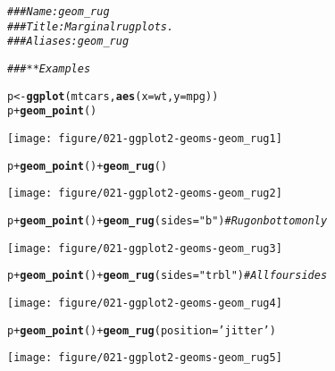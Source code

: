 \documentclass[a4paper,titlepage]{tufte-handout}\usepackage[]{graphicx}\usepackage[]{color}
\makeatletter
\def\maxwidth{ %
  \ifdim\Gin@nat@width>\linewidth
    \linewidth
  \else
    \Gin@nat@width
  \fi
}
\newcommand{\hlstr}[1]{\textcolor[rgb]{0.192,0.494,0.8}{#1}}%
\newcommand{\hlcom}[1]{\textcolor[rgb]{0.678,0.584,0.686}{\textit{#1}}}%
\newcommand{\hlopt}[1]{\textcolor[rgb]{0,0,0}{#1}}%
\newcommand{\hlstd}[1]{\textcolor[rgb]{0.345,0.345,0.345}{#1}}%
\newcommand{\hlkwb}[1]{\textcolor[rgb]{0.69,0.353,0.396}{#1}}%
\newcommand{\hlkwc}[1]{\textcolor[rgb]{0.333,0.667,0.333}{#1}}%
\newcommand{\hlkwd}[1]{\textcolor[rgb]{0.737,0.353,0.396}{\textbf{#1}}}%
\newenvironment{kframe}{%
 \def\at@end@of@kframe{}%
 \ifinner\ifhmode%
  \def\at@end@of@kframe{\end{minipage}}%
  \begin{minipage}{\columnwidth}%
 \fi\fi%
 \def\FrameCommand##1{\hskip\@totalleftmargin \hskip-\fboxsep
 \colorbox{shadecolor}{##1}\hskip-\fboxsep
     \hskip-\linewidth \hskip-\@totalleftmargin \hskip\columnwidth}%
 \MakeFramed {\advance\hsize-\width
   \@totalleftmargin\z@ \linewidth\hsize
   \@setminipage}}%
 {\par\unskip\endMakeFramed%
 \at@end@of@kframe}
\newenvironment{knitrout}{}{} %
\makeatother
\begin{document}
\begin{knitrout}
\color{fgcolor}\begin{kframe}
\begin{alltt}
\hlcom{### Name: geom_rug}
\hlcom{### Title: Marginal rug plots.}
\hlcom{### Aliases: geom_rug}

\hlcom{### ** Examples}

\hlstd{p} \hlkwb{<-} \hlkwd{ggplot}\hlstd{(mtcars,} \hlkwd{aes}\hlstd{(}\hlkwc{x}\hlstd{=wt,} \hlkwc{y}\hlstd{=mpg))}
\hlstd{p} \hlopt{+} \hlkwd{geom_point}\hlstd{()}
\end{alltt}
\end{kframe}
\texttt{[image: figure/021-ggplot2-geoms-geom\_rug1]} 
\begin{kframe}\begin{alltt}
\hlstd{p} \hlopt{+} \hlkwd{geom_point}\hlstd{()} \hlopt{+} \hlkwd{geom_rug}\hlstd{()}
\end{alltt}
\end{kframe}
\texttt{[image: figure/021-ggplot2-geoms-geom\_rug2]} 
\begin{kframe}\begin{alltt}
\hlstd{p} \hlopt{+} \hlkwd{geom_point}\hlstd{()} \hlopt{+} \hlkwd{geom_rug}\hlstd{(}\hlkwc{sides}\hlstd{=}\hlstr{"b"}\hlstd{)}    \hlcom{# Rug on bottom only}
\end{alltt}
\end{kframe}
\texttt{[image: figure/021-ggplot2-geoms-geom\_rug3]} 
\begin{kframe}\begin{alltt}
\hlstd{p} \hlopt{+} \hlkwd{geom_point}\hlstd{()} \hlopt{+} \hlkwd{geom_rug}\hlstd{(}\hlkwc{sides}\hlstd{=}\hlstr{"trbl"}\hlstd{)} \hlcom{# All four sides}
\end{alltt}
\end{kframe}
\texttt{[image: figure/021-ggplot2-geoms-geom\_rug4]} 
\begin{kframe}\begin{alltt}
\hlstd{p} \hlopt{+} \hlkwd{geom_point}\hlstd{()} \hlopt{+} \hlkwd{geom_rug}\hlstd{(}\hlkwc{position}\hlstd{=}\hlstr{'jitter'}\hlstd{)}
\end{alltt}
\end{kframe}
\texttt{[image: figure/021-ggplot2-geoms-geom\_rug5]} 

\end{knitrout}
\end{document}
